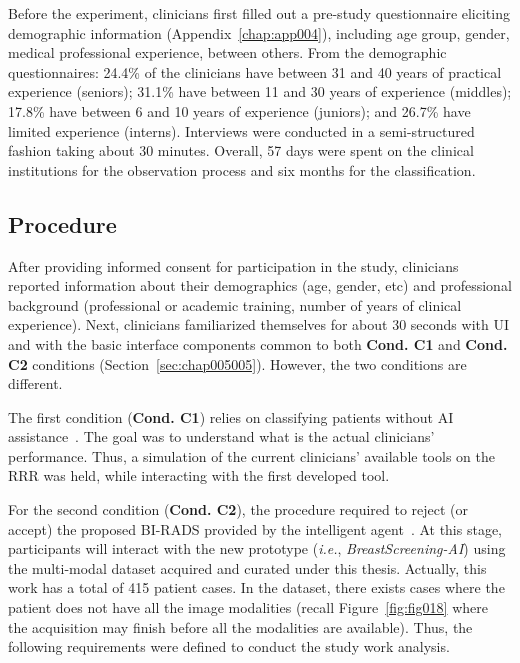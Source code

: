 Before the experiment, clinicians first filled out a pre-study questionnaire eliciting demographic information (Appendix~\ref{chap:app004}), including age group, gender, medical professional experience, between others.
From the demographic questionnaires:
24.4\% of the clinicians have between 31 and 40 years of practical experience (seniors);
31.1\% have between 11 and 30 years of experience (middles);
17.8\% have between 6 and 10 years of experience (juniors); and
26.7\% have limited experience (interns).
Interviews were conducted in a semi-structured fashion taking about 30 minutes.
Overall, 57 days were spent on the clinical institutions for the observation process and six months for the classification.

\subsection{Procedure}
\label{sec:chap005005002}

After providing informed consent for participation in the study, clinicians reported information about their demographics (age, gender, etc) and professional background (professional or academic training, number of years of clinical experience).
Next, clinicians familiarized themselves for about 30 seconds with \ac{UI} and with the basic interface components common to both {\bf Cond. C1} and {\bf Cond. C2} conditions (Section~\ref{sec:chap005005}).
However, the two conditions are different.

The first condition ({\bf Cond. C1}) relies on classifying patients without \ac{AI} assistance~\cite{10.1145/3399715.3399744}.
The goal was to understand what is the actual clinicians' performance.
Thus, a simulation of the current clinicians' available tools on the \ac{RRR} was held, while interacting with the first developed tool.

For the second condition ({\bf Cond. C2}), the procedure required to reject (or accept) the proposed \ac{BI-RADS} provided by the intelligent agent~\cite{https://doi.org/10.13140/rg.2.2.16566.14403/1}.
At this stage, participants will interact with the new prototype ({\it i.e.}, {\it BreastScreening-AI}) using the multi-modal dataset acquired and curated under this thesis.
Actually, this work has a total of 415 patient cases.
In the dataset, there exists cases where the patient does not have all the image modalities (recall Figure~\ref{fig:fig018} where the acquisition may finish before all the modalities are available).
Thus, the following requirements were defined to conduct the study work analysis.

